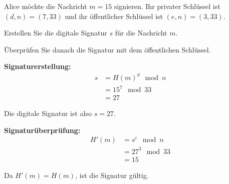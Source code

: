 \begin{myexercise}
	Alice möchte die Nachricht \( m = 15 \) signieren. Ihr privater Schlüssel ist \( (d, n) = (7, 33) \) und ihr öffentlicher Schlüssel ist \( (e, n) = (3, 33) \).

	Erstellen Sie die digitale Signatur \( s \) für die Nachricht \( m \).

	Überprüfen Sie danach die Signatur mit dem öffentlichen Schlüssel.
	\begin{myanswer}
		\textbf{Signaturerstellung:}
		\begin{align*}
			s & = H(m)^d \mod n \\
			  & = 15^{7} \mod 33 \\
			  & = 27
		\end{align*}

		Die digitale Signatur ist also \( s = 27 \).

		\textbf{Signaturüberprüfung:}
		\begin{align*}
			H'(m) & = s^e \mod n \\
			      & = 27^3 \mod 33 \\
			      & = 15
		\end{align*}

		Da \( H'(m) = H(m) \), ist die Signatur gültig.
	\end{myanswer}
\end{myexercise}